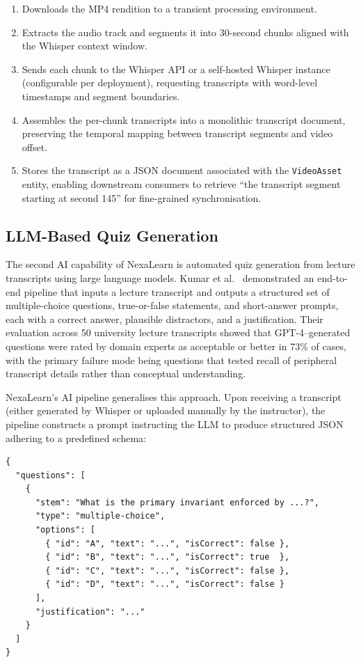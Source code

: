 \begin{enumerate}
  \item Downloads the MP4 rendition to a transient processing environment.
  \item Extracts the audio track and segments it into 30-second chunks aligned with the Whisper context window.
  \item Sends each chunk to the Whisper API or a self-hosted Whisper instance (configurable per deployment), requesting transcripts with word-level timestamps and segment boundaries.
  \item Assembles the per-chunk transcripts into a monolithic transcript document, preserving the temporal mapping between transcript segments and video offset.
  \item Stores the transcript as a JSON document associated with the \texttt{VideoAsset} entity, enabling downstream consumers to retrieve ``the transcript segment starting at second 145'' for fine-grained synchronisation.
\end{enumerate}

\subsection{LLM-Based Quiz Generation}

The second AI capability of NexaLearn is automated quiz generation from lecture transcripts using large language models. Kumar et al.~\cite{kumar2023llmquiz} demonstrated an end-to-end pipeline that inputs a lecture transcript and outputs a structured set of multiple-choice questions, true-or-false statements, and short-answer prompts, each with a correct answer, plausible distractors, and a justification. Their evaluation across 50 university lecture transcripts showed that GPT-4--generated questions were rated by domain experts as acceptable or better in 73\% of cases, with the primary failure mode being questions that tested recall of peripheral transcript details rather than conceptual understanding.

NexaLearn's AI pipeline generalises this approach. Upon receiving a transcript (either generated by Whisper or uploaded manually by the instructor), the pipeline constructs a prompt instructing the LLM to produce structured JSON adhering to a predefined schema:

\begin{lstlisting}[caption=AI-generated quiz JSON schema,label=lst:ai-quiz-schema]
{
  "questions": [
    {
      "stem": "What is the primary invariant enforced by ...?",
      "type": "multiple-choice",
      "options": [
        { "id": "A", "text": "...", "isCorrect": false },
        { "id": "B", "text": "...", "isCorrect": true  },
        { "id": "C", "text": "...", "isCorrect": false },
        { "id": "D", "text": "...", "isCorrect": false }
      ],
      "justification": "..."
    }
  ]
}
\end{lstlisting}

